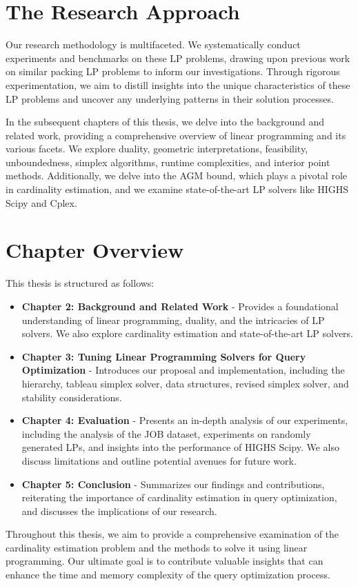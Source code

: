 \section{The Research Approach}

Our research methodology is multifaceted. We systematically 
conduct experiments and benchmarks on these LP problems, drawing 
upon previous work on similar packing LP problems to inform our 
investigations. Through rigorous experimentation, we aim to distill
 insights into the unique characteristics of these LP problems and 
 uncover any underlying patterns in their solution processes.

In the subsequent chapters of this thesis, we delve into the 
background and related work, providing a comprehensive overview
 of linear programming and its various facets. We explore duality, 
 geometric interpretations, feasibility, unboundedness, simplex algorithms,
  runtime complexities, and interior point methods. Additionally, we delve 
  into the AGM bound, which plays a pivotal role in cardinality estimation, 
  and we examine state-of-the-art LP solvers like HIGHS Scipy and Cplex.

\section{Chapter Overview}

This thesis is structured as follows:

\begin{itemize}
  \item \textbf{Chapter 2: Background and Related Work} - Provides a 
  foundational understanding of linear programming, duality, 
  and the intricacies of LP solvers. We also explore cardinality
   estimation and state-of-the-art LP solvers.
  \item \textbf{Chapter 3: Tuning Linear Programming Solvers for Query
   Optimization} - Introduces our proposal and implementation, 
   including the hierarchy, tableau simplex solver, data structures, 
   revised simplex solver, and stability considerations.
  \item \textbf{Chapter 4: Evaluation} - Presents an in-depth analysis 
  of our experiments, including the analysis of the JOB dataset, experiments 
  on randomly generated LPs, and insights into the performance of HIGHS Scipy.
   We also discuss limitations and outline potential avenues for future work.
  \item \textbf{Chapter 5: Conclusion} - Summarizes our findings 
  and contributions, reiterating the importance of cardinality estimation 
  in query optimization, and discusses the implications of our research.
\end{itemize}

Throughout this thesis, we aim to provide a comprehensive 
examination of the cardinality estimation problem and the methods 
to solve it using linear programming. Our ultimate goal is to contribute 
valuable insights that can enhance the time and memory complexity of the 
query optimization process.

